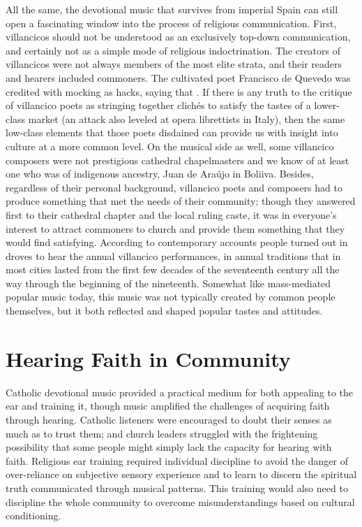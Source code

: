 All the same, the devotional music that survives from imperial Spain
can still open a fascinating window into the process of religious communication.
First, villancicos should not be understood as an exclusively top-down
communication, and certainly not as a simple mode of religious indoctrination.
The creators of villancicos were not always members of the most elite strata,
and their readers and hearers included commoners.
The cultivated poet Francisco de Quevedo was credited with mocking  as hacks, saying that .%
    \Autocite[37]{Torres:SuenosMorales}
If there is any truth to the critique of villancico poets as stringing together
clichés to satisfy the tastes of a lower-class market (an attack also leveled at
opera librettists in Italy), then the same low-class elements that those poets
disdained can provide us with insight into culture at a more common level.
On the musical side as well, some villancico composers were not prestigious
cathedral chapelmasters and we know of at least one who was of indigenous
ancestry, Juan de Araújo in Boliiva.%
    \Autocite{Illari:Popular}
Besides, regardless of their personal background, villancico poets and composers
had to produce something that met the needs of their community; though they
answered first to their cathedral chapter and the local ruling caste, it was in
everyone's interest to attract commoners to church and provide them something
that they would find satisfying.
According to contemporary accounts people turned out in droves to hear the
annual villancico performances, in annual traditions that in most cities lasted
from the first few decades of the seventeenth century all the way through the
beginning of the nineteenth.
Somewhat like mass-mediated popular music today, this music was not typically
created by common people themselves, but it both reflected and shaped popular
tastes and attitudes.

\section{Hearing Faith in Community}

Catholic devotional music provided a practical medium for both appealing to the
ear and training it, though music amplified the challenges of acquiring faith
through hearing.
Catholic listeners were encouraged to doubt their senses as much as to trust
them; and church leaders struggled with the frightening possibility that some
people might simply lack the capacity for hearing with faith.
Religious ear training required individual discipline to avoid the danger of
over-reliance on subjective sensory experience and to learn to discern the
spiritual truth communicated through musical patterns.
This training would also need to discipline the whole community to overcome
misunderstandings based on cultural conditioning.

